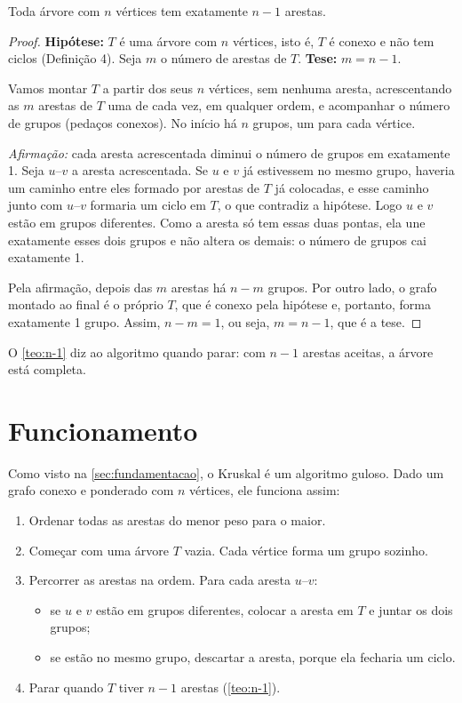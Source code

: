 \documentclass[a4paper]{article}
\begin{document}
\begin{teorema}\label{teo:n-1}
Toda árvore com $n$ vértices tem exatamente $n-1$ arestas.
\end{teorema}

\begin{proof}
\textbf{Hipótese:} $T$ é uma árvore com $n$ vértices, isto é, $T$ é conexo e não
tem ciclos (Definição 4). Seja $m$ o número de arestas de $T$.
\textbf{Tese:} $m = n-1$.

Vamos montar $T$ a partir dos seus $n$ vértices, sem nenhuma aresta,
acrescentando as $m$ arestas de $T$ uma de cada vez, em qualquer ordem, e
acompanhar o número de grupos (pedaços conexos). No início há $n$ grupos, um para
cada vértice.

\emph{Afirmação:} cada aresta acrescentada diminui o número de grupos em
exatamente 1. Seja $u$--$v$ a aresta acrescentada. Se $u$ e $v$ já estivessem no
mesmo grupo, haveria um caminho entre eles formado por arestas de $T$ já
colocadas, e esse caminho junto com $u$--$v$ formaria um ciclo em $T$, o que
contradiz a hipótese. Logo $u$ e $v$ estão em grupos diferentes. Como a aresta só
tem essas duas pontas, ela une exatamente esses dois grupos e não altera os
demais: o número de grupos cai exatamente 1.

Pela afirmação, depois das $m$ arestas há $n-m$ grupos. Por outro lado, o grafo
montado ao final é o próprio $T$, que é conexo pela hipótese e, portanto, forma
exatamente 1 grupo. Assim, $n - m = 1$, ou seja, $m = n-1$, que é a tese.
\end{proof}

O \cref{teo:n-1} diz ao algoritmo quando parar: com $n-1$ arestas aceitas, a
árvore está completa.

\section{Funcionamento}\label{sec:funcionamento}
Como visto na \cref{sec:fundamentacao}, o Kruskal é um algoritmo guloso. Dado um
grafo conexo e ponderado com $n$ vértices, ele funciona assim:
\begin{enumerate}
    \item Ordenar todas as arestas do menor peso para o maior.
    \item Começar com uma árvore $T$ vazia. Cada vértice forma um grupo sozinho.
    \item Percorrer as arestas na ordem. Para cada aresta $u$--$v$:
    \begin{itemize}
        \item se $u$ e $v$ estão em grupos diferentes, colocar a aresta em $T$ e juntar os dois grupos;
        \item se estão no mesmo grupo, descartar a aresta, porque ela fecharia um ciclo.
    \end{itemize}
    \item Parar quando $T$ tiver $n-1$ arestas (\cref{teo:n-1}).
\end{enumerate}
\end{document}
